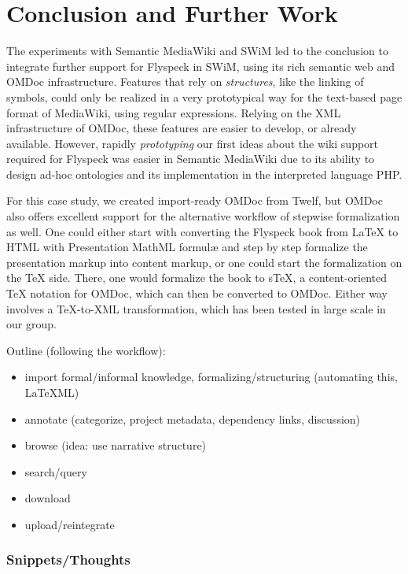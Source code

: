 
\section{Conclusion and Further Work}
\label{sec:conc}

The experiments with Semantic MediaWiki and SWiM led to the conclusion to
integrate further support for Flyspeck in SWiM, using its rich semantic web and
OMDoc infrastructure.  Features that rely on \emph{structures}, like the linking
of symbols, could only be realized in a very prototypical way for the text-based
page format of MediaWiki, using regular expressions.  Relying on the XML
infrastructure of OMDoc, these features are easier to develop, or already
available.  However, rapidly \emph{prototyping} our first ideas about the wiki
support required for Flyspeck was easier in Semantic MediaWiki due to its
ability to design ad-hoc ontologies and its implementation in the interpreted
language PHP.

For this case study, we created import-ready OMDoc from Twelf, but OMDoc also
offers excellent support for the alternative workflow of stepwise formalization
as well\cite[chap.\ 4]{Kohlhase:omdoc1.2}.  One could either start with
converting the Flyspeck book from {\LaTeX} to HTML with Presentation MathML
formulæ and step by step formalize the presentation markup into content markup,
or one could start the formalization on the {\TeX} side.  There, one would
formalize the book to s\TeX{}, a content-oriented {\TeX} notation for OMDoc,
which can then be converted to OMDoc\cite{Kohlhase:albwo06}.  Either way
involves a {\TeX}-to-XML transformation, which has been tested in large scale in
our group\cite{URL:arXMLiv}.

Outline (following the workflow):
\begin{itemize}
\item import formal/informal knowledge, formalizing/structuring (automating
  this, LaTeXML)
\item annotate (categorize, project metadata, dependency links, discussion)
\item browse (idea: use narrative structure)
\item search/query
\item download
\item upload/reintegrate
\end{itemize}

\subsubsection{Snippets/Thoughts}

